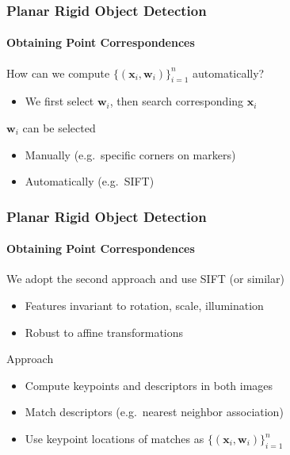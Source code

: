 \documentclass[xetex,professionalfont]{beamer}
\renewcommand{\vec}[1]{\ensuremath{\mathbf{#1}}}
\newcommand{\vw}{\vec{w}}
\newcommand{\vx}{\vec{x}}
\begin{document}
\begin{frame}
\frametitle{Planar Rigid Object Detection}
\framesubtitle{Obtaining Point Correspondences}

How can we compute $\{(\vx_i,\vw_i)\}_{i=1}^n$ automatically?
\begin{itemize}
    \item We first select $\vw_i$, then search corresponding $\vx_i$
\end{itemize}

\bigskip
$\vw_i$ can be selected
\begin{itemize}
    \item Manually (e.g.\ specific corners on markers)
    \item Automatically (e.g.\ SIFT)
\end{itemize}

\end{frame}


\begin{frame}
\frametitle{Planar Rigid Object Detection}
\framesubtitle{Obtaining Point Correspondences}

We adopt the second approach and use SIFT (or similar)
\begin{itemize}
    \item Features invariant to rotation, scale, illumination %
    \item Robust to affine transformations %
\end{itemize}

\bigskip
Approach
\begin{itemize}
    \item Compute keypoints and descriptors in both images
    \item Match descriptors (e.g.\ nearest neighbor association)
    \item Use keypoint locations of matches as $\{(\vx_i,\vw_i)\}_{i=1}^n$
\end{itemize}

\end{frame}

\end{document}
